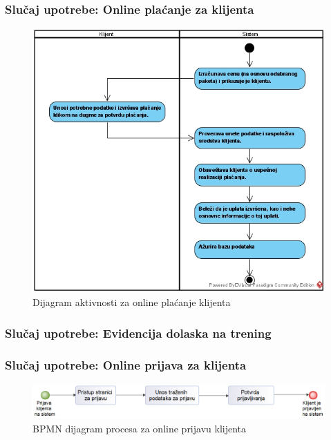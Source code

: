 \documentclass[a4paper]{article}
\begin{document}
\subsubsection{Slučaj upotrebe: Online plaćanje za klijenta}

\begin{figure}[!ht]
\begin{center}
\includegraphics[scale=0.40]{sections/images/dijagram_aktivnosti_za_online_placanje_klijenta.jpg}
\end{center}
\caption{Dijagram aktivnosti za online plaćanje klijenta}
\label{fig:kontekst}
\end{figure}

\subsubsection{Slučaj upotrebe: Evidencija dolaska na trening}


\subsubsection{Slučaj upotrebe: Online prijava za klijenta}

\begin{figure}[!ht]
\begin{center}
\includegraphics[scale=0.55]{sections/images/bpmn_dijagram_procesa_online_prijava_klijenta_na_sistem.png}
\end{center}
\caption{BPMN dijagram procesa za online prijavu klijenta}
\label{fig:kontekst}
\end{figure}
\end{document}
